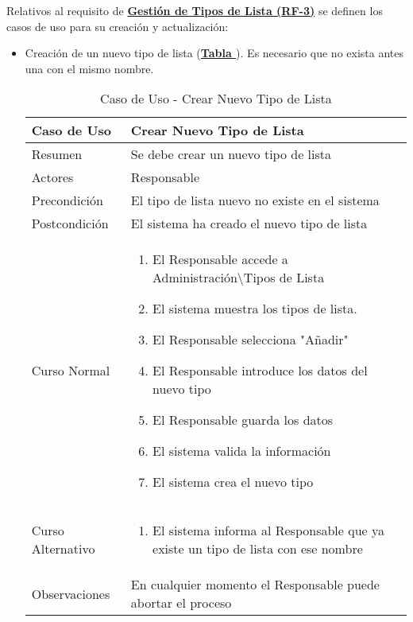 Relativos al requisito de \textbf{\hyperref[tab:rfGestTipoLst]{Gestión de Tipos de Lista (RF-3)}} se definen los casos de uso para su creación y actualización:
\begin{itemize}
	\item \addtocounter{tabla}{1} Creación de un nuevo tipo de lista (\textbf{\hyperref[tab:curCrearTipoLst]{Tabla }}). Es necesario que no exista antes una con el mismo nombre.
		\begin{table}[!htbp]
		  \centering  \addtocounter{casouso}{1}
		  \begin{tabular}{|l | p{100mm}|}
		    \textbf{Caso de Uso}  & \textbf{Crear Nuevo Tipo de Lista} \\ \hline
		    Resumen 		 & Se debe crear un nuevo tipo de lista \\ \hline
		    Actores  		 & Responsable \\ \hline
		    Precondición  	 & El tipo de lista nuevo no existe en el sistema  \\ \hline
		    Postcondición  	 & El sistema ha creado el nuevo tipo de lista \\ \hline
		    Curso Normal   	 & \begin{enumerate}
			  \item El Responsable accede a Administración\textbackslash Tipos de Lista
			  \item El sistema muestra los tipos de lista.
			  \item El Responsable selecciona "Añadir"
			  \item El Responsable introduce los datos del nuevo tipo
			  \item El Responsable guarda los datos
			  \item El sistema valida la información
			  \item El sistema crea el nuevo tipo
		    \end{enumerate}  \\ \hline
		    Curso Alternativo  & \begin{enumerate}
			  \item El sistema informa al Responsable que ya existe un tipo de lista con ese nombre
		    \end{enumerate}  \\ \hline
		    Observaciones 	 & En cualquier momento el Responsable puede abortar el proceso  \\ \hline
		  \end{tabular}
		  \caption{Caso de Uso  - Crear Nuevo Tipo de Lista}
		  \label{tab:curCrearTipoLst}
		\end{table}
		\FloatBarrier
	

\end{itemize}
